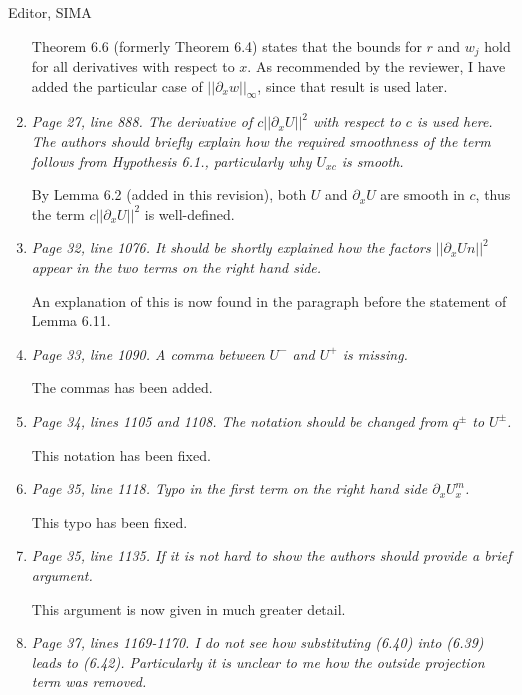 \documentclass[11pt]{letter}
\begin{document}
\begin{letter}{Editor, SIMA}
\begin{enumerate}
Theorem 6.6 (formerly Theorem 6.4) states that the bounds for $r$ and $w_j$ hold for all derivatives with respect to $x$. As recommended by the reviewer, I have added the particular case of $||\partial_x w||_\infty$, since that result is used later.

\item \emph{Page 27, line 888. The derivative of $c||\partial_x U||^2$ with respect to $c$ is used here. The authors should briefly explain how the required smoothness of the term follows from Hypothesis 6.1., particularly why $U_{xc}$ is smooth.}
\vspace{4mm}

By Lemma 6.2 (added in this revision), both $U$ and $\partial_x U$ are smooth in $c$, thus the term $c||\partial_x U||^2$ is well-defined.

\item \emph{Page 32, line 1076. It should be shortly explained how the factors $||\partial_x Un||^2$ appear in the two terms on the right hand side.}
\vspace{4mm}

An explanation of this is now found in the paragraph before the statement of Lemma 6.11.

\item \emph{Page 33, line 1090. A comma between $U^-$ and $U^+$ is missing.}
\vspace{4mm}

The commas has been added.%

\item \emph{Page 34, lines 1105 and 1108. The notation should be changed from $q^\pm$ to $U^\pm$.}
\vspace{4mm}

This notation has been fixed.%

\item \emph{Page 35, line 1118. Typo in the first term on the right hand side $\partial_x U_x^m$.}
\vspace{4mm}

This typo has been fixed.%

\item \emph{Page 35, line 1135. If it is not hard to show the authors should provide a brief argument.}
\vspace{4mm}

This argument is now given in much greater detail.

\item \emph{Page 37, lines 1169-1170. I do not see how substituting (6.40) into (6.39) leads to (6.42). Particularly it is unclear to me how the outside projection term was removed.}
\vspace{4mm}


\end{enumerate}
\end{letter}
\end{document}

